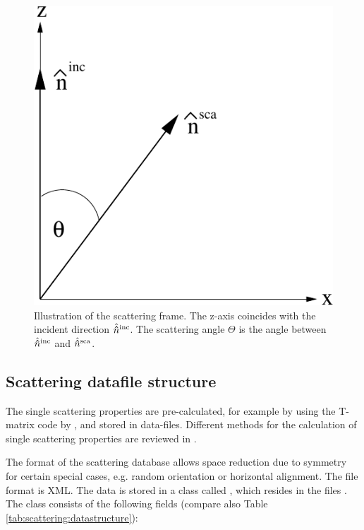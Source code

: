 \begin{figure}[htbp]
 \begin{center}
   \includegraphics*[width=0.4\hsize]{part_frame}
   \caption{Illustration of the scattering frame. The z-axis coincides with the incident direction $\hat{{\bf \hat{n}}}^{\mathrm{inc}}$. The scattering angle $\Theta$ is the angle between  $\hat{{\bf \hat{n}}}^{\mathrm{inc}}$ and $\hat{{\bf \hat{n}}}^{\mathrm{sca}}$.}
   \label{fig:scattering:part_frame}  
 \end{center}
\end{figure}

\subsection{Scattering datafile structure}
\label{sec:clouds:ARTS_SSP_structure}
 
The single scattering properties are pre-calculated, for example by
using the T-matrix 
code by \citet{Mishchenko:02}, and stored in data-files. Different
methods for the calculation of single scattering properties are
reviewed in \citet{emde05:_phdthesis}. 

The format of the scattering database allows space reduction due to
symmetry for certain special cases, e.g. random orientation or
horizontal alignment. The file format is XML. The data is stored in a
class called , which resides in
the files . The class consists of the
following 
fields (compare also Table \ref{tab:scattering:datastructure}):

